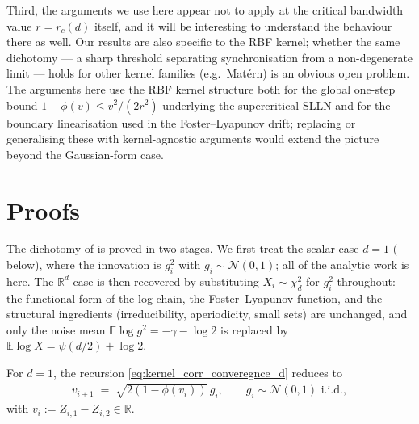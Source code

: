 \documentclass{article}
\newcommand{\RR}{\mathbb{R}}
\newcommand{\Exp}[1]{\mathbb{E} #1}
\newcommand{\mcN}{\mathcal{N}}
\begin{document}
Third, 
the arguments we use here appear not to apply at the critical bandwidth value $r = r_c(d)$ itself, and it will be interesting to understand the behaviour there as well. Our results are also specific to the RBF kernel; whether the same dichotomy --- a sharp threshold separating synchronisation from a non-degenerate limit --- holds for other kernel families (e.g.\ Mat\'ern) is an obvious open problem. The arguments here use the RBF kernel structure both for the global one-step bound $1 - \phi(v) \le v^2/(2r^2)$ underlying the supercritical SLLN and for the boundary linearisation used in the Foster--Lyapunov drift; replacing or generalising these with kernel-agnostic arguments would extend the picture beyond the Gaussian-form case.




\clearpage
\appendix

\section{Proofs}
\label{sec:proofs}

The dichotomy of  is proved in two stages. We first treat the scalar case $d = 1$ ( below), where the innovation is $g_i^2$ with $g_i \sim \mcN(0,1)$; all of the analytic work is here. The $\RR^d$ case is then recovered by substituting $X_i \sim \chi^2_d$ for $g_i^2$ throughout: the functional form of the log-chain, the Foster--Lyapunov function, and the structural ingredients (irreducibility, aperiodicity, small sets) are unchanged, and only the noise mean $\Exp{\log g^2} = -\gamma - \log 2$ is replaced by $\Exp{\log X} = \psi(d/2) + \log 2$.

For $d = 1$, the recursion \eqref{eq:kernel_corr_converegnce_d} reduces to
\begin{eqnarray}
  \label{eq:kernel_corr_converegnce}
  v_{i+1} \;=\; \sqrt{2(1 - \phi(v_i))}\, g_i, \qquad g_i \sim \mcN(0, 1) \text{ i.i.d.},
\end{eqnarray}
with $v_i := Z_{i,1} - Z_{i,2} \in \RR$.
\end{document}
